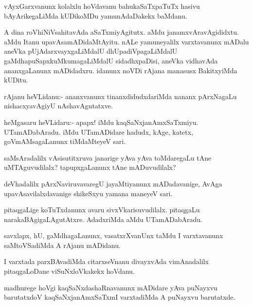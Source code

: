 \begin{mng}
vAyxGarxvanunx kolalxlu hoVdavanu bahukaSaTxpaTuTx hasivu bAyArikegaLiMda kUDikoMDu yamunAdaDakekx baMdanu.
\end{mng}

\begin{mng}
A dina roVhiNiVsahitavAda aSaTxmiyAgitutx. aMdu janamxvAravAgididxtu. aMdu Itanu upavAsamADidaMtAyitu. nALe yamuneyalilx varxtavanunx mADalu aneVka pUjAdarxvayxgaLiMdalU dhUpadiVpagaLiMdalU gaMdhapuSapxkuMkumagaLiMdalU sidadhxpaDisi, aneVka vidhavAda ananxgaLanunx mADidadxru. idanunx noVDi rAjana manasusx BakitxyiMda kUDitu.
\end{mng}

\begin{mng}
rAjanu heVLidanu:- ananxvanunx tinanxdidudxdariMda nananx pArxNagaLu nishacxyavAgiyU nAshavAgutatxve.
\end{mng}

\begin{mng}
heMgasaru heVLidaru:- apapx! iMdu kaqSaNxjanAmxSaTxmiyu. UTamADabAradu. iMdu UTamADidare hadudx, kAge, katetx, goVmAMsagaLanunx tiMdaMteyeV sari.
\end{mng}

\begin{mng}
saMsAradalilx vAsisutitxruva janarige yAva yAva toMdaregaLu tAne uMTAguvudilalx? tapupxgaLanunx tAne mADuvudilalx?
\end{mng}

\begin{mng}
deVhadalilx pArxNaviruvavaregU jayaMtiyanunx mADadavanige, AvAga upavAsavilalxdavanige shikeSxyu yamana maneyeV sari.
\end{mng}

\begin{mng}
pitaqgaLige koTuTxdanunx avaru sivxVkarisuvudilalx. pitaqgaLu narakaBAgigaLAgutAtxre. AdadxriMda aMdu UTamADabAradu.
\end{mng}

\begin{mng}
savxlapx, hU, gaMdhagaLanunx, vasatxrXvanUnx taMdu I varxtavanunx saMtoVSadiMda A rAjanu mADidanu.
\end{mng}

\begin{mng}
I varxtada parxBAvadiMda citarxseVnanu divayxvAda vimAnadalilx pitaqgaLoDane viSuNxloVkakekx hoVdanu.
\end{mng}

\begin{mng}
madhurege hoVgi kaqSaNxdashaRnavanunx mADidare yAva puNayxvu barutatxdoV kaqSaNxjanAmxSaTxmI varxtadiMda A puNayxvu barutatxde.
\end{mng}

